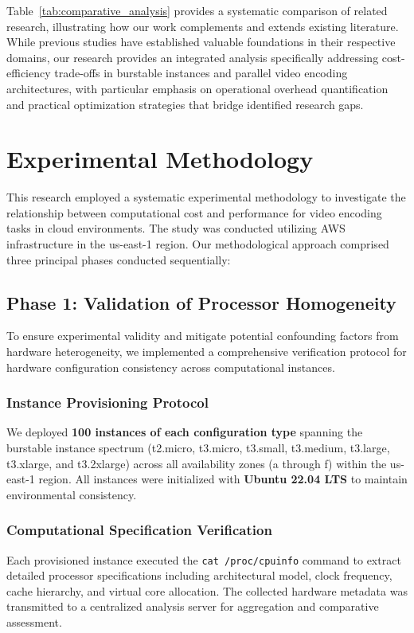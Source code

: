 \documentclass[conference]{IEEEtran}
\begin{document}
	Table~\ref{tab:comparative_analysis} provides a systematic comparison of related research, illustrating how our work complements and extends existing literature. While previous studies have established valuable foundations in their respective domains, our research provides an integrated analysis specifically addressing cost-efficiency trade-offs in burstable instances and parallel video encoding architectures, with particular emphasis on operational overhead quantification and practical optimization strategies that bridge identified research gaps.
	
	\section{Experimental Methodology}
	\label{met}
	
	This research employed a systematic experimental methodology to investigate the relationship between computational cost and performance for video encoding tasks in cloud environments. The study was conducted utilizing AWS infrastructure in the us-east-1 region. Our methodological approach comprised three principal phases conducted sequentially:
	
	\subsection{Phase 1: Validation of Processor Homogeneity}
	\label{met:validation-processor-homogeneity}
	
	To ensure experimental validity and mitigate potential confounding factors from hardware heterogeneity, we implemented a comprehensive verification protocol for hardware configuration consistency across computational instances.
	
	\subsubsection{Instance Provisioning Protocol}
	We deployed \textbf{100 instances of each configuration type} spanning the burstable instance spectrum (t2.micro, t3.micro, t3.small, t3.medium, t3.large, t3.xlarge, and t3.2xlarge) across all availability zones (a through f) within the us-east-1 region. All instances were initialized with \textbf{Ubuntu 22.04 LTS} to maintain environmental consistency.
	
	\subsubsection{Computational Specification Verification}
	Each provisioned instance executed the \texttt{cat /proc/cpuinfo} command to extract detailed processor specifications including architectural model, clock frequency, cache hierarchy, and virtual core allocation. The collected hardware metadata was transmitted to a centralized analysis server for aggregation and comparative assessment.
	
\end{document}
